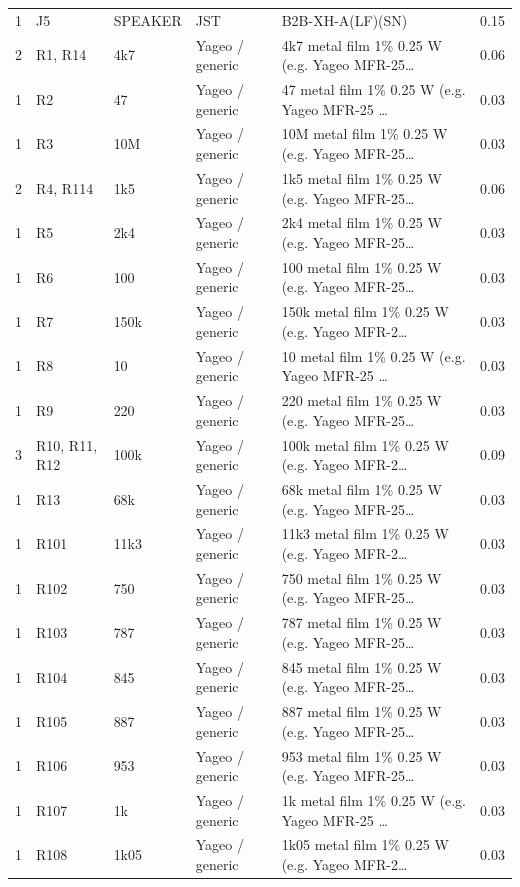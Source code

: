 \documentclass[10pt,a4paper]{article}
\begin{document}
{\begin{longtable}{rp{3.6cm}lp{2.2cm}p{4.6cm}r}
1 & J5 & SPEAKER & JST & B2B-XH-A(LF)(SN) & 0.15 \\
2 & R1, R14 & 4k7 & Yageo / generic & 4k7 metal film 1\% 0.25 W (e.g. Yageo MFR-25\ldots{} & 0.06 \\
1 & R2 & 47 & Yageo / generic & 47 metal film 1\% 0.25 W (e.g. Yageo MFR-25 \ldots{} & 0.03 \\
1 & R3 & 10M & Yageo / generic & 10M metal film 1\% 0.25 W (e.g. Yageo MFR-25\ldots{} & 0.03 \\
2 & R4, R114 & 1k5 & Yageo / generic & 1k5 metal film 1\% 0.25 W (e.g. Yageo MFR-25\ldots{} & 0.06 \\
1 & R5 & 2k4 & Yageo / generic & 2k4 metal film 1\% 0.25 W (e.g. Yageo MFR-25\ldots{} & 0.03 \\
1 & R6 & 100 & Yageo / generic & 100 metal film 1\% 0.25 W (e.g. Yageo MFR-25\ldots{} & 0.03 \\
1 & R7 & 150k & Yageo / generic & 150k metal film 1\% 0.25 W (e.g. Yageo MFR-2\ldots{} & 0.03 \\
1 & R8 & 10 & Yageo / generic & 10 metal film 1\% 0.25 W (e.g. Yageo MFR-25 \ldots{} & 0.03 \\
1 & R9 & 220 & Yageo / generic & 220 metal film 1\% 0.25 W (e.g. Yageo MFR-25\ldots{} & 0.03 \\
3 & R10, R11, R12 & 100k & Yageo / generic & 100k metal film 1\% 0.25 W (e.g. Yageo MFR-2\ldots{} & 0.09 \\
1 & R13 & 68k & Yageo / generic & 68k metal film 1\% 0.25 W (e.g. Yageo MFR-25\ldots{} & 0.03 \\
1 & R101 & 11k3 & Yageo / generic & 11k3 metal film 1\% 0.25 W (e.g. Yageo MFR-2\ldots{} & 0.03 \\
1 & R102 & 750 & Yageo / generic & 750 metal film 1\% 0.25 W (e.g. Yageo MFR-25\ldots{} & 0.03 \\
1 & R103 & 787 & Yageo / generic & 787 metal film 1\% 0.25 W (e.g. Yageo MFR-25\ldots{} & 0.03 \\
1 & R104 & 845 & Yageo / generic & 845 metal film 1\% 0.25 W (e.g. Yageo MFR-25\ldots{} & 0.03 \\
1 & R105 & 887 & Yageo / generic & 887 metal film 1\% 0.25 W (e.g. Yageo MFR-25\ldots{} & 0.03 \\
1 & R106 & 953 & Yageo / generic & 953 metal film 1\% 0.25 W (e.g. Yageo MFR-25\ldots{} & 0.03 \\
1 & R107 & 1k & Yageo / generic & 1k metal film 1\% 0.25 W (e.g. Yageo MFR-25 \ldots{} & 0.03 \\
1 & R108 & 1k05 & Yageo / generic & 1k05 metal film 1\% 0.25 W (e.g. Yageo MFR-2\ldots{} & 0.03 \\

\end{longtable}}
\end{document}
